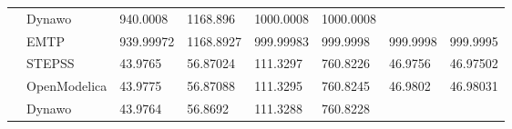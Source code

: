 \documentclass{report}
\begin{document}
\begin{table}[H]
\begin{tabular}{ll|l|l|l|l|l|l}
\multicolumn{1}{l|}{}                              & Dynawo       & 940.0008                                                                          & 1168.896                                                                          & 1000.0008                                                                         & 1000.0008                                                                         &                                                                                   &                                                                                  \\
\multicolumn{1}{l|}{}                              & EMTP         & 939.99972                                                                         & 1168.8927                                                                         & 999.99983                                                                         & 999.9998                                                                          & 999.9998                                                                          & 999.9995                                                                         \\ \hline
\multicolumn{1}{l|}{\parbox[t]{2mm}{}}     & STEPSS       & 43.9765                                                                           & 56.87024                                                                          & 111.3297                                                                          & 760.8226                                                                          & 46.9756                                                                           & 46.97502                                                                         \\
\multicolumn{1}{l|}{}                              & OpenModelica & 43.9775                                                                           & 56.87088                                                                          & 111.3295                                                                          & 760.8245                                                                          & 46.9802                                                                           & 46.98031                                                                         \\
\multicolumn{1}{l|}{}                              & Dynawo       & 43.9764                                                                           & 56.8692                                                                           & 111.3288                                                                          & 760.8228                                                                          &                                                                                   &                                                                                  \\

\end{tabular}
\end{table}
\end{document}
